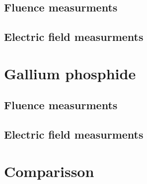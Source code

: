\subsection{Fluence measurments}

\subsection{Electric field measurments}


\section{Gallium phosphide}
\subsection{Fluence measurments}
\subsection{Electric field measurments}


\section{Comparisson}